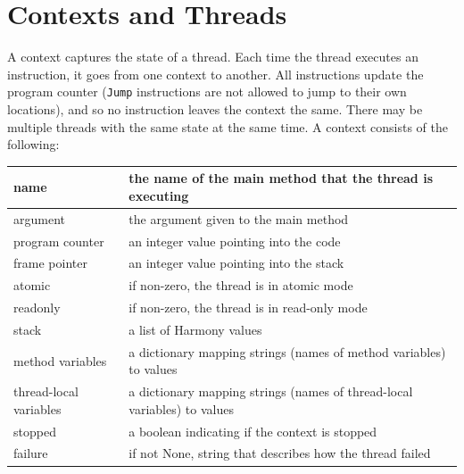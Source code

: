 \documentclass{report}
\begin{document}
\section{Contexts and Threads}
\label{ap:context}

A context captures the state of a thread.  Each time the thread
executes an instruction, it goes from one context to another.
All instructions update the program counter (\texttt{Jump} instructions
are not allowed to jump to their own locations), and so no instruction
leaves the context the same.
There may be multiple threads
with the same state at the same time.
A context consists of the following:

\vspace{1em}
\begin{tabular}{|l|l|}
\hline
name & the name of the main method that the thread is executing \\
\hline
argument & the argument given to the main method \\
\hline
program counter & an integer value pointing into the code \\
\hline
frame pointer & an integer value pointing into the stack \\
\hline
atomic & if non-zero, the thread is in atomic mode \\
\hline
readonly & if non-zero, the thread is in read-only mode \\
\hline
stack & a list of Harmony values \\
\hline
method variables & a dictionary mapping strings (names of method variables) to values \\
\hline
thread-local variables & a dictionary mapping strings (names of thread-local variables) to values \\
\hline
stopped & a boolean indicating if the context is stopped \\
\hline
failure & if not None, string that describes how the thread failed \\
\hline
\end{tabular}
\vspace{1em}
\end{document}
